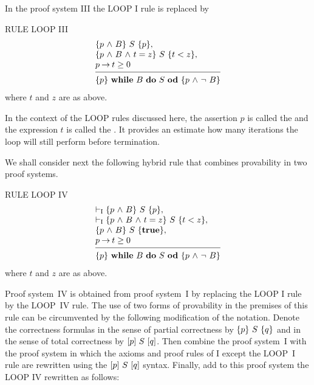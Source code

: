 \documentclass[manuscript, screen, review]{acmart}
\begin{document}
In the proof system III the  LOOP I rule is replaced by
\III

\NI
RULE \label{rul:loop2} LOOP III
\[
 \begin{array}{l}
  \HT{p \A B}{S}{p},                      \\
  \HT{p \A B \A t=z}{S}{t<z},             \\
  p \ra t \geq 0                         \\
  [-\medskipamount]
  \hrulefill                              \\
  \HT{p}{\WDD{B}{S}}{p \A \neg\ B}
 \end{array}
\]
%
\NI
where $t$ and $z$ are as above.

\III

In the context of the LOOP rules discussed here, 
the assertion $p$ is called the  and the expression $t$
is called the . It provides an estimate how
many iterations the loop will still perform before termination.

We shall consider next the following hybrid rule that combines provability in two
proof systems.
\III

\NI
RULE LOOP IV
\[
 \begin{array}{l}
  \vdash_{\rm{I}}  \HT{p \A B}{S}{p},             \\
  \vdash_{\rm{I}}   \HT{p \A B \A t=z}{S}{t<z},   \\
  \HT{p \A B}{S}{\mathbf{true}},                  \\
  p \ra t \geq 0                                 \\
  [-\medskipamount]
  \hrulefill                                      \\
  \HT{p}{\WDD{B}{S}}{p \A \neg\ B}
 \end{array}
\]
%
\NI
where $t$ and $z$ are as above.
\III

Proof system~IV is obtained from proof system~I by replacing the LOOP
I rule by the LOOP~IV rule. The use of two forms of provability in the
premises of this rule can be circumvented by the following
modification of the notation.  Denote the correctness
formulas in the sense of partial correctness by $\mbox{$\{{p}\}\ {S}\ \{{q}\}$}$ and in
the sense of total correctness by $[{p}]\ {S}\ [{q}]$. Then combine the
proof system~I with the proof system in which the axioms and proof
rules of I except the LOOP~I rule are rewritten using the
$[{p}]\ {S}\ [{q}]$ syntax. Finally, add to this proof system the LOOP IV
rewritten as follows:
\III
\end{document}
